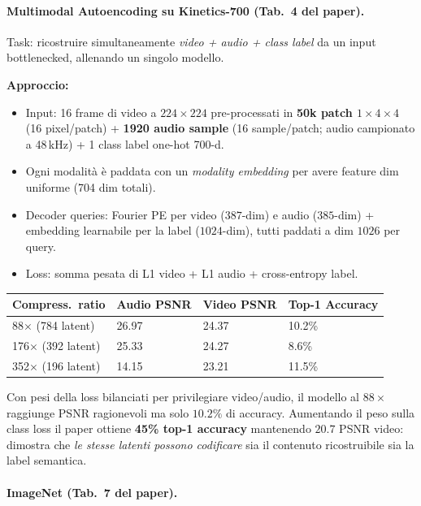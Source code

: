 \documentclass[
  11pt,
]{article}
\begin{document}
\paragraph{Multimodal Autoencoding su Kinetics-700 (Tab.\ 4 del paper).} Task: ricostruire simultaneamente \emph{video + audio + class label} da un input bottlenecked, allenando un singolo modello.

\textbf{Approccio:}
\begin{itemize}\setlength\itemsep{0.1em}
\item Input: 16 frame di video a $224\times224$ pre-processati in \textbf{50k patch $1\times 4\times 4$} (16 pixel/patch) + \textbf{1920 audio sample} (16 sample/patch; audio campionato a 48\,kHz) + 1 class label one-hot 700-d.
\item Ogni modalità è paddata con un \emph{modality embedding} per avere feature dim uniforme (704 dim totali).
\item Decoder queries: Fourier PE per video ($387$-dim) e audio ($385$-dim) + embedding learnabile per la label ($1024$-dim), tutti paddati a dim $1026$ per query.
\item Loss: somma pesata di L1 video + L1 audio + cross-entropy label.
\end{itemize}

{\small
\begin{longtable}{@{}p{3cm} p{2.5cm} p{2.5cm} p{3cm}@{}}
\toprule
\textbf{Compress.\ ratio} & \textbf{Audio PSNR} & \textbf{Video PSNR} & \textbf{Top-1 Accuracy} \\
\midrule
\endhead
88$\times$ (784 latent) & 26.97 & 24.37 & 10.2\% \\[2pt]
176$\times$ (392 latent) & 25.33 & 24.27 & 8.6\% \\[2pt]
352$\times$ (196 latent) & 14.15 & 23.21 & 11.5\% \\
\bottomrule
\end{longtable}
}

\begin{notabox}[title={\textbf{Trade-off ricostruzione vs classificazione}}]
Con pesi della loss bilanciati per privilegiare video/audio, il modello al $88\times$ raggiunge PSNR ragionevoli ma solo $10.2\%$ di accuracy. Aumentando il peso sulla class loss il paper ottiene \textbf{45\% top-1 accuracy} mantenendo $20.7$ PSNR video: dimostra che \emph{le stesse latenti possono codificare} sia il contenuto ricostruibile sia la label semantica.
\end{notabox}

\paragraph{ImageNet (Tab.\ 7 del paper).}
\end{document}
